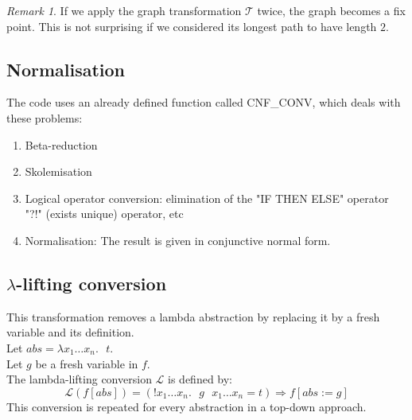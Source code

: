 \documentclass[a4paper, 11pt]{article}
\theoremstyle{plain}
\theoremstyle{definition}
\theoremstyle{remark}
\newtheorem*{remark}{Remark}
\begin{document}
\begin{center}
\end{center}

\begin{remark}
If we apply the graph transformation $\mathcal{T}$ twice, the graph becomes a fix point. This is not surprising if we considered its longest path to have length $2$.
\end{remark}

\subsection{Normalisation} 
The code uses an already defined function called CNF{\_}CONV, which deals with these problems:
\begin{enumerate}
  \item Beta-reduction  
  \item Skolemisation
  \item Logical operator conversion:  elimination of the 
  "IF THEN ELSE" operator  "?!" (exists unique) operator, etc
  \item Normalisation: The result is given in conjunctive normal form.
\end{enumerate}

\subsection{$\lambda$-lifting conversion}
This transformation removes a lambda abstraction by replacing it by a fresh variable and its definition.
\\Let $abs = \lambda x_1 \ldots x_n.\mbox{ } t$.
\\Let $g$ be a fresh variable in $f$.
\\The lambda-lifting conversion $\mathcal{L}$ is defined by:
\[\mathcal{L}(f[abs]) =
  (!x_1 \ldots x_n.\mbox{ } g\mbox{ }x_1 \ldots x_n = t) 
  \Rightarrow f[abs := g] \]
This conversion is repeated for every abstraction in a top-down approach.
\end{document}
